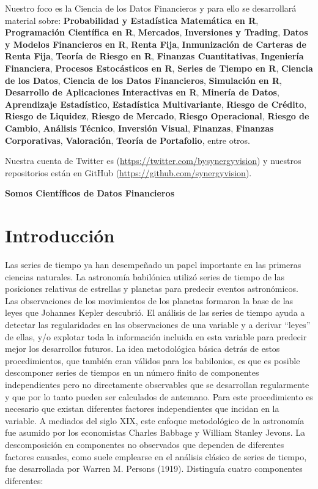 \documentclass[12pt,]{krantz}
\theoremstyle{definition}
\theoremstyle{definition}
\theoremstyle{definition}
\theoremstyle{remark}
\begin{document}
Nuestro foco es la Ciencia de los Datos Financieros y para ello se
desarrollará material sobre: \textbf{Probabilidad y Estadística
Matemática en R}, \textbf{Programación Científica en R},
\textbf{Mercados}, \textbf{Inversiones y Trading}, \textbf{Datos y
Modelos Financieros en R}, \textbf{Renta Fija}, \textbf{Inmunización de
Carteras de Renta Fija}, \textbf{Teoría de Riesgo en R},
\textbf{Finanzas Cuantitativas}, \textbf{Ingeniería Financiera},
\textbf{Procesos Estocásticos en R}, \textbf{Series de Tiempo en R},
\textbf{Ciencia de los Datos}, \textbf{Ciencia de los Datos
Financieros}, \textbf{Simulación en R}, \textbf{Desarrollo de
Aplicaciones Interactivas en R}, \textbf{Minería de Datos},
\textbf{Aprendizaje Estadístico}, \textbf{Estadística Multivariante},
\textbf{Riesgo de Crédito}, \textbf{Riesgo de Liquidez}, \textbf{Riesgo
de Mercado}, \textbf{Riesgo Operacional}, \textbf{Riesgo de Cambio},
\textbf{Análisis Técnico}, \textbf{Inversión Visual}, \textbf{Finanzas},
\textbf{Finanzas Corporativas}, \textbf{Valoración}, \textbf{Teoría de
Portafolio}, entre otros.

Nuestra cuenta de Twitter es (\url{https://twitter.com/bysynergyvision})
y nuestros repositorios están en GitHub
(\url{https://github.com/synergyvision}).

\textbf{Somos Científicos de Datos Financieros}

\chapter{Introducción}\label{introduccion}

Las series de tiempo ya han desempeñado un papel importante en las
primeras ciencias naturales. La astronomía babilónica utilizó series de
tiempo de las posiciones relativas de estrellas y planetas para predecir
eventos astronómicos. Las observaciones de los movimientos de los
planetas formaron la base de las leyes que Johannes Kepler descubrió. El
análisis de las series de tiempo ayuda a detectar las regularidades en
las observaciones de una variable y a derivar ``leyes'' de ellas, y/o
explotar toda la información incluida en esta variable para predecir
mejor los desarrollos futuros. La idea metodológica básica detrás de
estos procedimientos, que también eran válidos para los babilonios, es
que es posible descomponer series de tiempos en un número finito de
componentes independientes pero no directamente observables que se
desarrollan regularmente y que por lo tanto pueden ser calculados de
antemano. Para este procedimiento es necesario que existan diferentes
factores independientes que incidan en la variable. A mediados del siglo
XIX, este enfoque metodológico de la astronomía fue asumido por los
economistas Charles Babbage y William Stanley Jevons. La descomposición
en componentes no observados que dependen de diferentes factores
causales, como suele emplearse en el análisis clásico de series de
tiempo, fue desarrollada por Warren M. Persons (1919). Distinguía cuatro
componentes diferentes:
\end{document}
